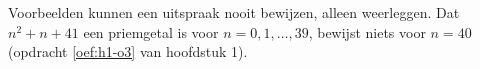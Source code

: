 Voorbeelden kunnen een uitspraak nooit bewijzen, alleen weerleggen. Dat $n^2 + n + 41$ een priemgetal is voor $n = 0, 1, \ldots, 39$, bewijst niets voor $n = 40$ (opdracht \ref{oef:h1-o3} van hoofdstuk 1).

\begin{oefeningen}
\end{oefeningen}

\opdrachtenkop

\begin{oefeningen}



























\end{oefeningen}



